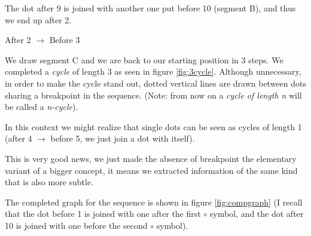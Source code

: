 \documentclass[11pt,final,twoside,nofrench]{thlifl}
\begin{document}
The dot after 9 is joined with another one put before 10 (segment B), and thus we end up after 2.

After 2 $\rightarrow$ Before 3

We draw segment C and we are back to our starting position in 3 steps. We completed a \emph{cycle} of length 3 as seen in figure \ref{fig:3cycle}. Although unnecessary, in order to make the cycle stand out, dotted vertical lines are drawn between dots sharing a breakpoint in the sequence.
(Note: from now on a \emph{cycle of length n} will be called a \emph{n-cycle}).

In this context we might realize that single dots can be seen as cycles of length 1 (after 4 $\rightarrow$ before 5, we just join a dot with itself).

This is very good news, we just made the absence of breakpoint the elementary variant of a bigger concept, it means we extracted information of the same kind that is also more subtle.

The completed graph for the sequence is shown in figure \ref{fig:compgraph} (I recall that the dot before 1 is joined with one after the first $\circ$ symbol, and the dot after 10 is joined with one before the second $\circ$ symbol).
\end{document}

